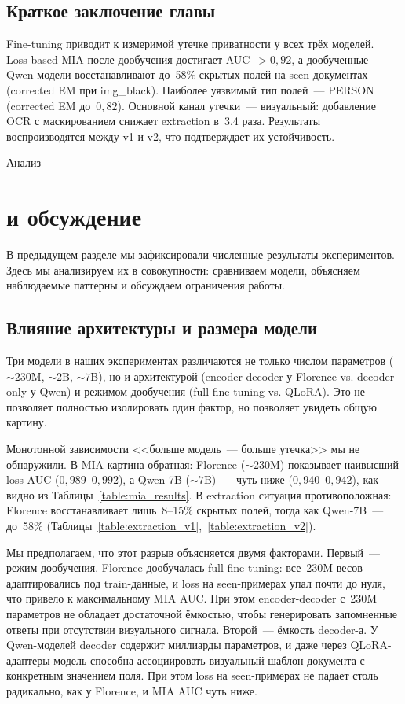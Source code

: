 \documentclass[a4paper,12pt]{extarticle}
\begin{document}
\subsection{Краткое заключение главы}
\label{sec:results_summary}

Fine-tuning приводит к измеримой утечке приватности у всех трёх моделей. Loss-based MIA после дообучения достигает AUC~$> 0{,}92$, а дообученные Qwen-модели восстанавливают до~58\% скрытых полей на seen-документах (corrected EM при img\_black). Наиболее уязвимый тип полей~--- PERSON (corrected EM до~$0{,}82$). Основной канал утечки~--- визуальный: добавление OCR с маскированием снижает extraction в~3.4 раза. Результаты воспроизводятся между v1 и v2, что подтверждает их устойчивость.


Анализ\section{ и обсуждение}
\label{sec:discussion}

В предыдущем разделе мы зафиксировали численные результаты экспериментов. Здесь мы анализируем их в совокупности: сравниваем модели, объясняем наблюдаемые паттерны и обсуждаем ограничения работы.

\subsection{Влияние архитектуры и размера модели}
\label{sec:discussion_architecture}

Три модели в наших экспериментах различаются не только числом параметров (${\sim}230$M, ${\sim}2$B, ${\sim}7$B), но и архитектурой (encoder-decoder у Florence vs. decoder-only у Qwen) и режимом дообучения (full fine-tuning vs. QLoRA). Это не позволяет полностью изолировать один фактор, но позволяет увидеть общую картину.

Монотонной зависимости <<больше модель~--- больше утечка>> мы не обнаружили. В MIA картина обратная: Florence (${\sim}230$M) показывает наивысший loss AUC ($0{,}989$--$0{,}992$), а Qwen-7B (${\sim}7$B)~--- чуть ниже ($0{,}940$--$0{,}942$), как видно из Таблицы~\ref{table:mia_results}. В extraction ситуация противоположная: Florence восстанавливает лишь~8--15\% скрытых полей, тогда как Qwen-7B~--- до~58\% (Таблицы~\ref{table:extraction_v1},~\ref{table:extraction_v2}).

Мы предполагаем, что этот разрыв объясняется двумя факторами. Первый~--- режим дообучения. Florence дообучалась full fine-tuning: все~230M весов адаптировались под train-данные, и loss на seen-примерах упал почти до нуля, что привело к максимальному MIA AUC. При этом encoder-decoder с~230M параметров не обладает достаточной ёмкостью, чтобы генерировать запомненные ответы при отсутствии визуального сигнала. Второй~--- ёмкость decoder-а. У Qwen-моделей decoder содержит миллиарды параметров, и даже через QLoRA-адаптеры модель способна ассоциировать визуальный шаблон документа с конкретным значением поля. При этом loss на seen-примерах не падает столь радикально, как у Florence, и MIA AUC чуть ниже.
\end{document}
